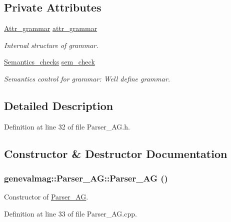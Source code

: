 \subsection*{Private Attributes}
\begin{DoxyCompactItemize}
\item 
\hyperlink{classgenevalmag_1_1Attr__grammar}{Attr\_\-grammar} \hyperlink{classgenevalmag_1_1Parser__AG_af806906189d19d98132d94b2fdf4a7d1}{attr\_\-grammar}
\begin{DoxyCompactList}\small\item\em Internal structure of grammar. \item\end{DoxyCompactList}\item 
\hyperlink{classgenevalmag_1_1Semantics__checks}{Semantics\_\-checks} \hyperlink{classgenevalmag_1_1Parser__AG_a0ae8c86d8db3e9e354377588754559fe}{sem\_\-check}
\begin{DoxyCompactList}\small\item\em Semantics control for grammar: Well define grammar. \item\end{DoxyCompactList}\end{DoxyCompactItemize}


\subsection{Detailed Description}


Definition at line 32 of file Parser\_\-AG.h.



\subsection{Constructor \& Destructor Documentation}
\hypertarget{classgenevalmag_1_1Parser__AG_a107da8e92db8c44204471982619ff339}{
\subsubsection[{Parser\_\-AG}]{\setlength{\rightskip}{0pt plus 5cm}genevalmag::Parser\_\-AG::Parser\_\-AG ()}}
\label{classgenevalmag_1_1Parser__AG_a107da8e92db8c44204471982619ff339}
Constructor of \hyperlink{classgenevalmag_1_1Parser__AG}{Parser\_\-AG}. 

Definition at line 33 of file Parser\_\-AG.cpp.

